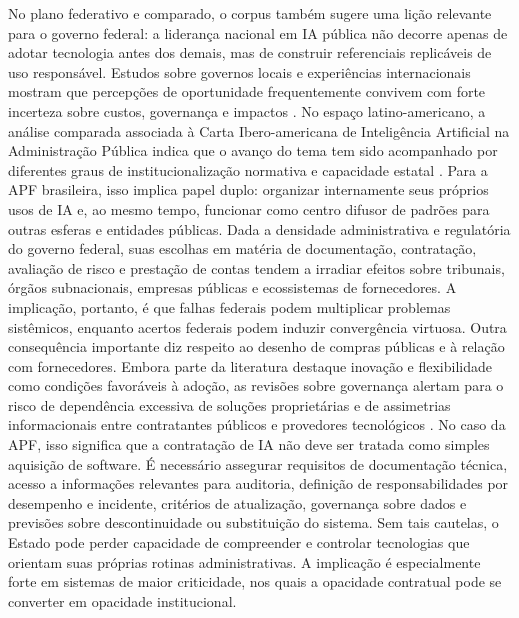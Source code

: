 \documentclass[12pt,a4paper]{article}
\begin{document}
No plano federativo e comparado, o corpus também sugere uma lição relevante para o governo federal: a liderança nacional em IA pública não decorre apenas de adotar tecnologia antes dos demais, mas de construir referenciais replicáveis de uso responsável. Estudos sobre governos locais e experiências internacionais mostram que percepções de oportunidade frequentemente convivem com forte incerteza sobre custos, governança e impactos \autocite{yiitcanlar2022artificial} \autocite{david2023understanding}. No espaço latino-americano, a análise comparada associada à Carta Ibero-americana de Inteligência Artificial na Administração Pública indica que o avanço do tema tem sido acompanhado por diferentes graus de institucionalização normativa e capacidade estatal \autocite{criado2024inteligencia}. Para a APF brasileira, isso implica papel duplo: organizar internamente seus próprios usos de IA e, ao mesmo tempo, funcionar como centro difusor de padrões para outras esferas e entidades públicas. Dada a densidade administrativa e regulatória do governo federal, suas escolhas em matéria de documentação, contratação, avaliação de risco e prestação de contas tendem a irradiar efeitos sobre tribunais, órgãos subnacionais, empresas públicas e ecossistemas de fornecedores. A implicação, portanto, é que falhas federais podem multiplicar problemas sistêmicos, enquanto acertos federais podem induzir convergência virtuosa.
Outra consequência importante diz respeito ao desenho de compras públicas e à relação com fornecedores. Embora parte da literatura destaque inovação e flexibilidade como condições favoráveis à adoção, as revisões sobre governança alertam para o risco de dependência excessiva de soluções proprietárias e de assimetrias informacionais entre contratantes públicos e provedores tecnológicos \autocite{batool2025ai} \autocite{madan2022ai}. No caso da APF, isso significa que a contratação de IA não deve ser tratada como simples aquisição de software. É necessário assegurar requisitos de documentação técnica, acesso a informações relevantes para auditoria, definição de responsabilidades por desempenho e incidente, critérios de atualização, governança sobre dados e previsões sobre descontinuidade ou substituição do sistema. Sem tais cautelas, o Estado pode perder capacidade de compreender e controlar tecnologias que orientam suas próprias rotinas administrativas. A implicação é especialmente forte em sistemas de maior criticidade, nos quais a opacidade contratual pode se converter em opacidade institucional.
\end{document}
